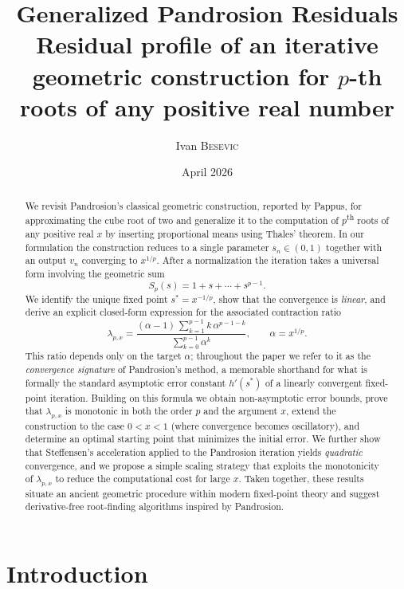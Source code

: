 \documentclass[11pt,a4paper]{article}
\title{\textbf{Generalized Pandrosion Residuals}\\[0.3em]
  \large Residual profile of an iterative geometric construction
  for $p$-th roots of any positive real number}
\author{Ivan \textsc{Besevic}}
\date{April 2026}
\theoremstyle{definition}
\begin{document}
\maketitle

\begin{abstract}
We revisit Pandrosion's classical geometric construction, reported by Pappus, for approximating the cube root of two and generalize it to the computation of $p$\textsuperscript{th} roots of any positive real $x$ by inserting proportional means using Thales' theorem.  In our formulation the construction reduces to a single parameter $s_n \in(0,1)$ together with an output $v_n$ converging to $x^{1/p}$.  After a normalization the iteration takes a universal form involving the geometric sum
\[
  S_p(s)=1+s+\cdots+s^{p-1}.
\]
We identify the unique fixed point $s^* = x^{-1/p}$, show that the convergence is \emph{linear}, and derive an explicit closed-form expression for the associated contraction ratio
\[
  \lambda_{p,x} = \frac{(\alpha - 1)\,\sum_{k=1}^{p-1} k\,\alpha^{p-1-k}}{\sum_{k=0}^{p-1} \alpha^k},
  \qquad \alpha = x^{1/p}.
\]
This ratio depends only on the target $\alpha$; throughout the paper we refer to it as the \emph{convergence signature} of Pandrosion's method, a memorable shorthand for what is formally the standard asymptotic error constant $h'(s^*)$ of a linearly convergent fixed-point iteration.  Building on this formula we obtain non-asymptotic error bounds, prove that $\lambda_{p,x}$ is monotonic in both the order $p$ and the argument $x$, extend the construction to the case $0<x<1$ (where convergence becomes oscillatory), and determine an optimal starting point that minimizes the initial error.  We further show that Steffensen's acceleration applied to the Pandrosion iteration yields \emph{quadratic} convergence, and we propose a simple scaling strategy that exploits the monotonicity of $\lambda_{p,x}$ to reduce the computational cost for large $x$.  Taken together, these results situate an ancient geometric procedure within modern fixed-point theory and suggest derivative-free root-finding algorithms inspired by Pandrosion.
\end{abstract}

\tableofcontents
\bigskip

\section{Introduction}
\end{document}

